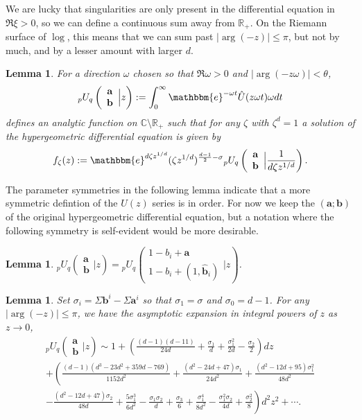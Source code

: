 \documentclass[12pt]{article}
\newcommand{\ee}[0] {\mathbbm{e}}
\numberwithin{equation}{section}
\newtheorem{lemma}[theorem]{Lemma}
\newcommand{\FF}[6] {{}_{#1}{#2}_{#3} \left( \begin{array}{c} #4 \\ #5 \end{array} \Big| {#6}  \right)}
\newcommand{\bfa}[0] {\mathbf{a}}
\newcommand{\bfb}[0] {\mathbf{b}}
\begin{document}
We are lucky that singularities are only present in the differential equation in $\Re \xi > 0$, so we can define a continuous sum away from $\mathbb{R}_{+}$. On the Riemann surface of $\log$, this means that we can sum past $|\arg(-z)|\le \pi$, but not by much, and by a lesser amount with larger $d$.

\begin{lemma}
\label{pUq_def}
For a direction $\omega$ chosen so that $\Re \omega > 0$ and $|\arg(-z \omega)| < \theta$,
\begin{equation*}
\FF{p}{U}{q}{\bfa}{\bfb}{z} := \int_{0}^{\infty} \ee^{-\omega t} \hat{U}(z \omega t) \omega dt
\end{equation*}
defines an analytic function on $\mathbb{C} \setminus \mathbb{R}_{+}$ such that for any $\zeta$ with $\zeta^d=1$ a solution of the hypergeometric differential equation is given by
\begin{equation*}
f_{\zeta}(z) := \ee^{d \zeta z^{1/d}} (\zeta z^{1/d})^{\frac{d-1}{2}-\sigma} \FF{p}{U}{q}{\bfa}{\bfb}{\frac{1}{d \zeta z^{1/d}}}\text{.}
\end{equation*}
\end{lemma}
The parameter symmetries in the following lemma indicate that a more symmetric defintion of the $U(z)$ series is in order. For now we keep the $(\bfa ; \bfb)$ of the original hypergeometric differential equation, but a notation where the following symmetry is self-evident would be more desirable.
\begin{lemma}
\label{lemma_pUq_inv} $\FF{p}{U}{q}{\bfa}{\bfb}{z} = \FF{p}{U}{q}{1-b_i+\bfa}{1-b_i+(1,\hat{\bfb}_{i})}{z}$.
\end{lemma}

\begin{lemma}
Set $\sigma_i = \Sigma\bfb^i-\Sigma\bfa^i$ so that $\sigma_1 = \sigma$ and $\sigma_0 = d-1$. For any $|\arg(-z)| \le \pi$, we have the asymptotic expansion in integral powers of $z$ as $z \to 0$,
\begin{gather*}
\FF{p}{U}{q}{\bfa}{\bfb}{z} \sim 1+ \left(\frac{(d-1)(d-11)}{24 d}+\frac{\sigma _1}{d}+\frac{\sigma _1^2}{2
   d}-\frac{\sigma
   _2}{2}\right)d z\\
+\left(\frac{(d-1)\left(d^3-23 d^2+359 d-769\right)}{1152 d^2} +\frac{\left(d^2-24 d+47\right) \sigma _1}{24d^2} + \frac{\left(d^2-12 d+95\right) \sigma _1^2}{48d^2} \right.\\
\left. -\frac{\left(d^2-12 d+47\right) \sigma_2}{48 d}+\frac{5\sigma_1^3}{6d^2}-\frac{\sigma_1 \sigma_2}{d}+\frac{\sigma_3}{6}+ \frac{\sigma _1^4}{8 d^2}-\frac{\sigma_1^2 \sigma _2}{4d}+\frac{\sigma
   _2^2}{8}\right)d^2 z^2+\cdots\text{.}
\end{gather*}
\end{lemma}
\end{document}
